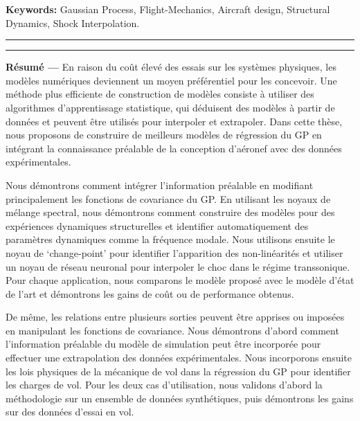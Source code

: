 {\large\textbf{Keywords:}}
    Gaussian Process, Flight-Mechanics, Aircraft design, Structural Dynamics, Shock Interpolation.
\\
\noindent\rule[2pt]{\textwidth}{0.5pt}

\pagebreak

\noindent\rule[2pt]{\textwidth}{0.5pt}

{\large\textbf{Résumé ---}}
En raison du coût élevé des essais sur les systèmes physiques, les modèles numériques deviennent un moyen préférentiel pour les concevoir. Une méthode plus efficiente de construction de modèles consiste à utiliser des algorithmes d'apprentissage statistique, qui déduisent des modèles à partir de données et peuvent être utilisés pour interpoler et extrapoler. Dans cette thèse, nous proposons de construire de meilleurs modèles de régression du GP en intégrant la connaissance préalable de la conception d'aéronef avec des données expérimentales.

Nous démontrons comment intégrer l'information préalable en modifiant principalement les fonctions de covariance du GP. En utilisant les noyaux de mélange spectral, nous démontrons comment construire des modèles pour des expériences dynamiques structurelles et identifier automatiquement des paramètres dynamiques comme la fréquence modale. Nous utilisons ensuite le noyau de `change-point' pour identifier l'apparition des non-linéarités et utiliser un noyau de réseau neuronal pour interpoler le choc dans le régime transsonique. Pour chaque application, nous comparons le modèle proposé avec le modèle d'état de l'art et démontrons les gains de coût ou de performance obtenus.


De même, les relations entre plusieurs sorties peuvent être apprises ou imposées en manipulant les fonctions de covariance. Nous démontrons d'abord comment l'information préalable du modèle de simulation peut être incorporée pour effectuer une extrapolation des données expérimentales. Nous incorporons ensuite les lois physiques de la mécanique de vol dans la régression du GP pour identifier les charges de vol. Pour les deux cas d'utilisation, nous validons d'abord la méthodologie sur un ensemble de données synthétiques, puis démontrons les gains sur des données d'essai en vol.

